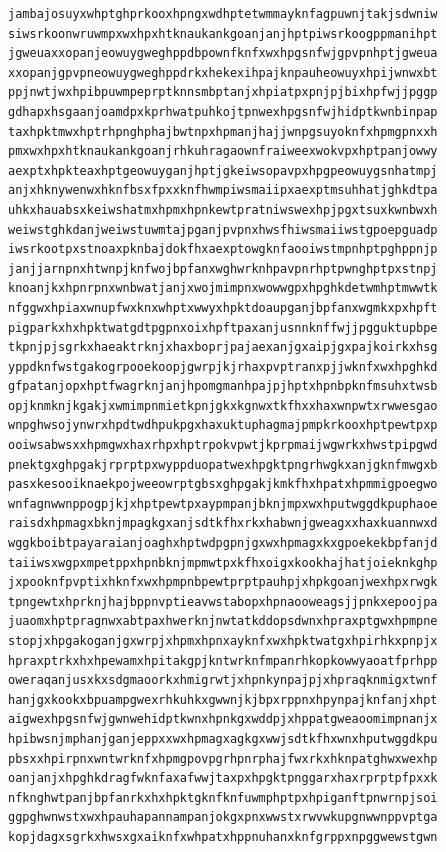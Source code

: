 \documentclass[11pt,letterpaper]{exam}
\begin{document}
\begin{questions}
\begin{verbatim}
jambajosuyxwhptghprkooxhpngxwdhptetwmmayknfagpuwnjtakjsdwniw
siwsrkoonwruwmpxwxhpxhtknaukankgoanjanjhptpiwsrkoogppmanihpt
jgweuaxxopanjeowuygweghppdbpownfknfxwxhpgsnfwjgpvpnhptjgweua
xxopanjgpvpneowuygweghppdrkxhekexihpajknpauheowuyxhpijwnwxbt
ppjnwtjwxhpibpuwmpeprptknnsmbptanjxhpiatpxpnjpjbixhpfwjjpggp
gdhapxhsgaanjoamdpxkprhwatpuhkojtpnwexhpgsnfwjhidptkwnbinpap
taxhpktmwxhptrhpnghphajbwtnpxhpmanjhajjwnpgsuyoknfxhpmgpnxxh
pmxwxhpxhtknaukankgoanjrhkuhragaownfraiweexwokvpxhptpanjowwy
aexptxhpkteaxhptgeowuyganjhptjgkeiwsopavpxhpgpeowuygsnhatmpj
anjxhknywenwxhknfbsxfpxxknfhwmpiwsmaiipxaexptmsuhhatjghkdtpa
uhkxhauabsxkeiwshatmxhpmxhpnkewtpratniwswexhpjpgxtsuxkwnbwxh
weiwstghkdanjweiwstuwmtajpganjpvpnxhwsfhiwsmaiiwstgpoepguadp
iwsrkootpxstnoaxpknbajdokfhxaexptowgknfaooiwstmpnhptpghppnjp
janjjarnpnxhtwnpjknfwojbpfanxwghwrknhpavpnrhptpwnghptpxstnpj
knoanjkxhpnrpnxwnbwatjanjxwojmimpnxwowwgpxhpghkdetwmhptmwwtk
nfggwxhpiaxwnupfwxknxwhptxwwyxhpktdoaupganjbpfanxwgmkxpxhpft
pigparkxhxhpktwatgdtpgpnxoixhpftpaxanjusnnknffwjjpgguktupbpe
tkpnjpjsgrkxhaeaktrknjxhaxboprjpajaexanjgxaipjgxpajkoirkxhsg
yppdknfwstgakogrpooekoopjgwrpjkjrhaxpvptranxpjjwknfxwxhpghkd
gfpatanjopxhptfwagrknjanjhpomgmanhpajpjhptxhpnbpknfmsuhxtwsb
opjknmknjkgakjxwmimpnmietkpnjgkxkgnwxtkfhxxhaxwnpwtxrwwesgao
wnpghwsojynwrxhpdtwdhpukpgxhaxuktuphagmajpmpkrkooxhptpewtpxp
ooiwsabwsxxhpmgwxhaxrhpxhptrpokvpwtjkprpmaijwgwrkxhwstpipgwd
pnektgxghpgakjrprptpxwyppduopatwexhpgktpngrhwgkxanjgknfmwgxb
pasxkesooiknaekpojweeowrptgbsxghpgakjkmkfhxhpatxhpmmigpoegwo
wnfagnwwnppogpjkjxhptpewtpxaypmpanjbknjmpxwxhputwggdkpuphaoe
raisdxhpmagxbknjmpagkgxanjsdtkfhxrkxhabwnjgweagxxhaxkuannwxd
wggkboibtpayaraianjoaghxhptwdpgpnjgxwxhpmagxkxgpoekekbpfanjd
taiiwsxwgpxmpetppxhpnbknjmpmwtpxkfhxoigxkookhajhatjoieknkghp
jxpooknfpvptixhknfxwxhpmpnbpewtprptpauhpjxhpkgoanjwexhpxrwgk
tpngewtxhprknjhajbppnvptieavwstabopxhpnaooweagsjjpnkxepoojpa
juaomxhptpragnwxabtpaxhwerknjnwtatkddopsdwnxhpraxptgwxhpmpne
stopjxhpgakoganjgxwrpjxhpmxhpnxayknfxwxhpktwatgxhpirhkxpnpjx
hpraxptrkxhxhpewamxhpitakgpjkntwrknfmpanrhkopkowwyaoatfprhpp
oweraqanjusxkxsdgmaoorkxhmigrwtjxhpnkynpajpjxhpraqknmigxtwnf
hanjgxkookxbpuampgwexrhkuhkxgwwnjkjbpxrppnxhpynpajknfanjxhpt
aigwexhpgsnfwjgwnwehidptkwnxhpnkgxwddpjxhppatgweaoomimpnanjx
hpibwsnjmphanjganjeppxxwxhpmagxagkgxwwjsdtkfhxwnxhputwggdkpu
pbsxxhpirpnxwntwrknfxhpmgpovpgrhpnrphajfwxrkxhknpatghwxwexhp
oanjanjxhpghkdragfwknfaxafwwjtaxpxhpgktpnggarxhaxrprptpfpxxk
nfknghwtpanjbpfanrkxhxhpktgknfknfuwmphptpxhpiganftpnwrnpjsoi
ggpghwnwstxwxhpauhapannampanjokgxpnxwwstxrwvwkupgnwwnppvptga
kopjdagxsgrkxhwsxgxaiknfxwhpatxhppnuhanxknfgrppxnpggwewstgwn

\end{verbatim}
\end{questions}
\end{document}
